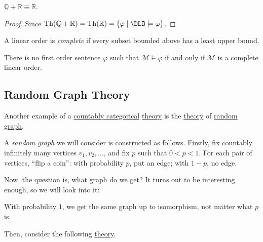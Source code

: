 \begin{corollary}
	\(\mathbb{Q} + \mathbb{R} \equiv \mathbb{R} \).
\end{corollary}
\begin{proof}
	Since \(\mathop{\mathrm{Th}}(\mathbb{Q} + \mathbb{R} ) = \mathop{\mathrm{Th}}(\mathbb{R} ) = \left\{ \varphi \mid \DLO \models \varphi \right\}\).
\end{proof}

\begin{definition}[Complete]\label{def:linear-order-complete}
	A linear order is \emph{complete} if every subset bounded above has a least upper bound.
\end{definition}

\begin{corollary}
	There is no first order \hyperref[def:sentence]{sentence} \(\varphi \) such that \(\mathcal{M} \models \varphi \) if and only if \(\mathcal{M} \) is a \hyperref[def:linear-order-complete]{complete} linear order.
\end{corollary}

\subsection{Random Graph Theory}
Another example of a \hyperref[def:countably-categorical]{countably categorical} \hyperref[def:theory]{theory} is the \hyperref[def:theory]{theory} of \hyperref[def:random-graph]{random graph}.

\begin{definition}\label{def:random-graph}
	A \emph{random graph} we will consider is constructed as follows. Firstly, fix countably infinitely many vertices \(v_1, v_2, \ldots \), and fix \(p\) such that \(0 < p < 1\). For each pair of vertices, ``flip a coin'': with probability \(p\), put an edge; with \(1-p\), no edge.
\end{definition}

Now, the question is, what graph do we get? It turns out to be interesting enough, so we will look into it:

\begin{remark}
	With probability \(1\), we get the same graph up to isomorphism, not matter what \(p\) is.
\end{remark}

Then, consider the following \hyperref[def:theory]{theory}.


